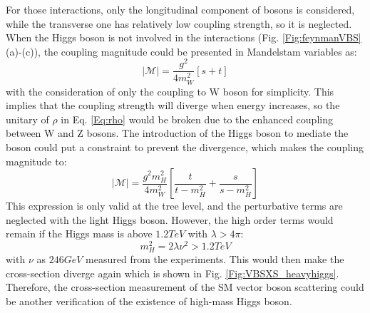 \noindent
For those interactions, only the longitudinal component of bosons is considered, while the transverse one has relatively low coupling strength, so it is neglected\cite{Brass:2018hfw}. When the Higgs boson is not involved in the interactions (Fig. \ref{Fig:feynmanVBS} (a)-(c)), the coupling magnitude\cite{Barger:1990py} could be presented in Mandelstam variables as:
\begin{equation}
|\mathcal{M}|=\frac{g^2}{4m_{W}^{2}}\left[s+t\right]
\end{equation}
with the consideration of only the coupling to W boson for simplicity. This implies that the coupling strength will diverge when energy increases, so the unitary of $\rho$ in Eq. \ref{Eq:rho} would be broken due to the enhanced coupling between W and Z bosons. The introduction of the Higgs boson to mediate the boson could put a constraint to prevent the divergence, which makes the coupling magnitude to:
\begin{equation}
|\mathcal{M}|=\frac{g^2m_{H}^2}{4m_{W}^{2}}\left[\frac{t}{t-m_{H}^{2}}+\frac{s}{s-m_{H}^{2}}\right]
\end{equation} 
This expression is only valid at the tree level, and the perturbative terms are neglected with the light Higgs boson\cite{Rindani:2009gm}. However, the high order terms would remain if the Higgs mass is above $1.2TeV$ with $\lambda > 4\pi$:
\begin{equation}
m^2_{H}=2\lambda\nu^2 > 1.2TeV
\end{equation}
with $\nu$ as $246GeV$ measured from the experiments. This would then make the cross-section diverge again which is shown in Fig. \ref{Fig:VBSXS_heavyhiggs}. Therefore, the cross-section measurement of the SM vector boson scattering could be another verification of the existence of high-mass Higgs boson.  

